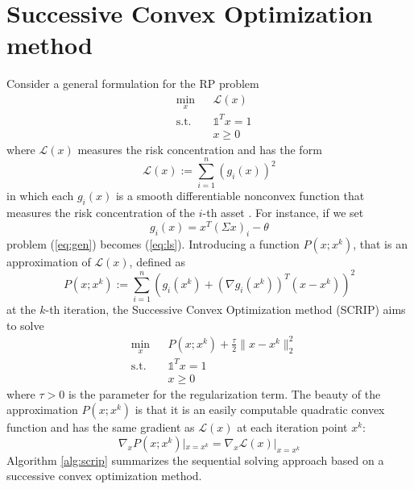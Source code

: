 \section{Successive Convex Optimization method}
Consider a general formulation for the RP problem
\begin{equation}\label{eq:gen}
\begin{aligned}
& \underset{x}{\text{min}}
&& \mathcal{L}(x)\\
& \text{s.t.}
&&\mathds{1}^T x = 1\\
&&&x \geq 0
\end{aligned}
\end{equation}
where $\mathcal{L}(x)$ measures the risk concentration and has the form
\begin{equation}
\mathcal{L}(x) := \sum_{i=1}^n (g_i(x))^2
\end{equation}
in which each $g_i(x)$ is a smooth differentiable nonconvex
function that measures the risk concentration of the $i$-th asset \cite{scrip}. For instance, if we set
\begin{equation}
g_i(x) = x^T (\Sigma x)_i - \theta
\end{equation}
problem (\ref{eq:gen}) becomes (\ref{eq:ls}). Introducing a function $P(x;x^{k})$, that is an approximation of $\mathcal{L}(x)$, defined as
\begin{equation}
P(x;x^{k}) := \sum_{i=1}^n (g_i(x^{k}) + (\nabla g_i(x^{k}))^T (x-x^{k}))^2
\end{equation}
at the $k$-th iteration, the Successive Convex Optimization method (SCRIP) aims to solve 
\begin{equation}\label{eq:scrip1}
\begin{aligned}
& \underset{x}{\text{min}}
&&P(x;x^{k}) + \frac{\tau}{2}\parallel x - x^{k} \parallel^2_2\\
& \text{s.t.}
&&\mathds{1}^T x = 1\\
&&&x \geq 0
\end{aligned}
\end{equation}
where $\tau > 0$ is the parameter for the regularization term. The beauty of the approximation $P(x;x^{k})$ is that it is an
easily computable quadratic convex function and has the same
gradient as $\mathcal{L}(x)$ at each iteration point $x^{k}$:
\begin{equation}
\nabla_x P(x;x^{k})|_{x=x^{k}} = \nabla_x \mathcal{L}(x)|_{x=x^{k}}
\end{equation}
Algorithm \ref{alg:scrip} summarizes the sequential solving approach based on a successive convex optimization method.

